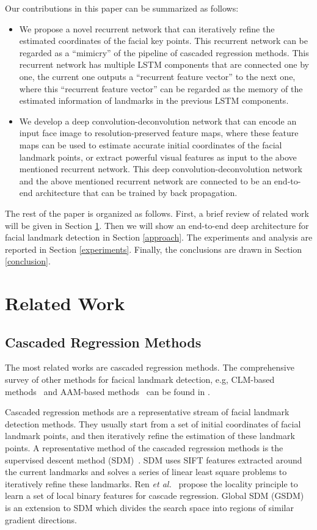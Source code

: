 \documentclass[journal]{IEEEtran}
\begin{document}
Our contributions in this paper can be summarized as follows:
\begin{itemize}
\item We propose a novel recurrent network that can iteratively refine the estimated coordinates of the facial key points. This recurrent network can be regarded as a ``mimicry'' of the pipeline of cascaded regression methods. This recurrent network has multiple LSTM components that are connected one by one, the current one outputs a ``recurrent feature vector'' to the next one, where this ``recurrent feature vector'' can be regarded as the memory of the estimated information of landmarks in the previous LSTM components.

\item We develop a deep convolution-deconvolution network that can encode an input face image to resolution-preserved feature maps, where these feature maps can be used to estimate accurate initial coordinates of the facial landmark points, or extract powerful visual features as input to the above mentioned recurrent network. This deep convolution-deconvolution network and the above mentioned recurrent network are connected to be an end-to-end architecture that can be trained by back propagation.

\end{itemize}


The rest of the paper is organized as follows. First, a brief review of related work will be given in Section \ref{related_work}. Then we will show an end-to-end deep architecture for facial landmark detection in Section \ref{approach}. The experiments and analysis are reported in Section \ref{experiments}. Finally, the conclusions are drawn in Section \ref{conclusion}.

\section{Related Work}
\label{related_work}

\subsection{Cascaded Regression Methods}
The most related works are cascaded regression methods. The comprehensive survey of other methods for facical landmark detection, e.g, CLM-based methods~\cite{martinez2013local} and AAM-based methods~\cite{gao2010review} can be found in \cite{wangsurvey}.

Cascaded regression methods are a representative stream of facial landmark detection methods. They usually start from a set of initial coordinates of facial landmark points, and then iteratively refine the estimation of these landmark points. A representative method of the cascaded regression methods is the supervised descent method (SDM)~\cite{sdm}. SDM uses SIFT features extracted around the current landmarks and solves a series of linear least square problems to iteratively refine these landmarks. Ren \textit{et al.}~\cite{lbf} propose the locality principle to learn a set of local binary features for cascade regression. Global SDM (GSDM)~\cite{globalsdm} is an extension to SDM which divides the search space into regions of similar gradient directions.
\end{document}
